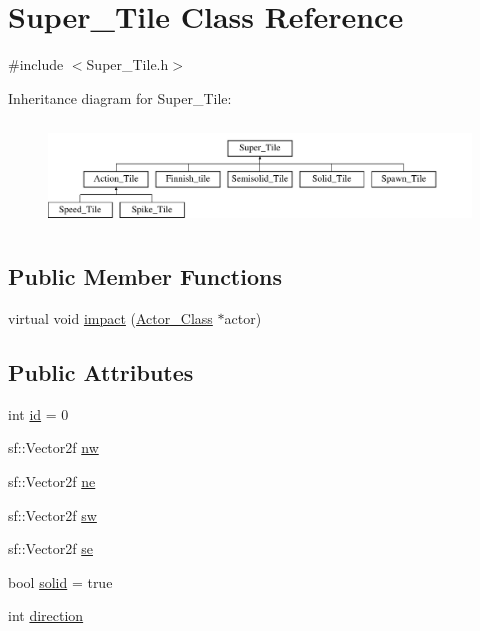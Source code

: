 \hypertarget{class_super___tile}{}\section{Super\+\_\+\+Tile Class Reference}
\label{class_super___tile}


{\ttfamily \#include $<$Super\+\_\+\+Tile.\+h$>$}

Inheritance diagram for Super\+\_\+\+Tile\+:\begin{figure}[H]
\begin{center}
\leavevmode
\includegraphics[height=2.800000cm]{class_super___tile}
\end{center}
\end{figure}
\subsection*{Public Member Functions}
\begin{DoxyCompactItemize}
\item 
virtual void \hyperlink{class_super___tile_a7b509383d0d0ad2df0220f7dc4660823}{impact} (\hyperlink{class_actor___class}{Actor\+\_\+\+Class} $\ast$actor)
\end{DoxyCompactItemize}
\subsection*{Public Attributes}
\begin{DoxyCompactItemize}
\item 
int \hyperlink{class_super___tile_afc4dffc7fdb4919c9790e1634c909698}{id} = 0
\item 
sf\+::\+Vector2f \hyperlink{class_super___tile_ad6bcea1fd54f67808f54ba2aacd88596}{nw}
\item 
sf\+::\+Vector2f \hyperlink{class_super___tile_a55f6d2860da36f13019bd4e0d18364ca}{ne}
\item 
sf\+::\+Vector2f \hyperlink{class_super___tile_abe9efe0c3d1ed440395225843435dfc8}{sw}
\item 
sf\+::\+Vector2f \hyperlink{class_super___tile_ab384b89a7a631b8b75c4d405c51a23e1}{se}
\item 
bool \hyperlink{class_super___tile_af486363a0321c167562c54da0f04884c}{solid} = true
\item 
int \hyperlink{class_super___tile_a11736ca52512c43b001d69a805c83de5}{direction}
\end{DoxyCompactItemize}


